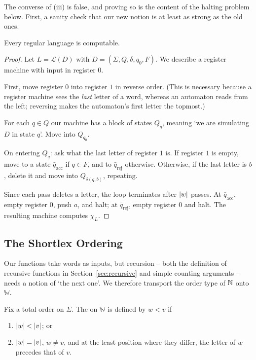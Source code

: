 \documentclass[a4paper]{scrartcl}
\newcommand{\WW}{\mathbb{W}}
\newcommand{\lang}{\mathcal{L}}
\begin{document}
The converse of (iii) is false, and proving so is the content of the halting problem below. First, a sanity check that our new notion is at least as strong as the old ones.

\begin{theorem}\label{thm:regularcomputable}
	Every regular language is computable.
\end{theorem}

\begin{proof}
	Let $L = \lang(D)$ with $D = (\Sigma, Q, \delta, q_0, F)$. We describe a register machine with input in register $0$.

	First, move register $0$ into register $1$ in reverse order. (This is necessary because a register machine sees the \emph{last} letter of a word, whereas an automaton reads from the left; reversing makes the automaton's first letter the topmost.)

	For each $q \in Q$ our machine has a block of states $Q_q$, meaning `we are simulating $D$ in state $q$'. Move into $Q_{q_0}$.

	On entering $Q_q$: ask what the last letter of register $1$ is. If register $1$ is empty, move to a state $\bar q_{\mathrm{acc}}$ if $q \in F$, and to $\bar q_{\mathrm{rej}}$ otherwise. Otherwise, if the last letter is $b$, delete it and move into $Q_{\delta(q,b)}$, repeating.

	Since each pass deletes a letter, the loop terminates after $\lvert w\rvert$ passes. At $\bar q_{\mathrm{acc}}$, empty register $0$, push $a$, and halt; at $\bar q_{\mathrm{rej}}$, empty register $0$ and halt. The resulting machine computes $\chi_L$.
\end{proof}

\subsection{The Shortlex Ordering}

Our functions take words as inputs, but recursion -- both the definition of recursive functions in Section~\ref{sec:recursive} and simple counting arguments -- needs a notion of `the next one'. We therefore transport the order type of $\mathbb{N}$ onto $\WW$.

\begin{definition}[Shortlex]
	Fix a total order on $\Sigma$. The  on $\WW$ is defined by $w < v$ if
	\begin{enumerate}[label=(\roman*)]
		\item $\lvert w\rvert < \lvert v\rvert$; or
		\item $\lvert w\rvert = \lvert v\rvert$, $w \neq v$, and at the least position where they differ, the letter of $w$ precedes that of $v$.
	\end{enumerate}
\end{definition}
\end{document}
